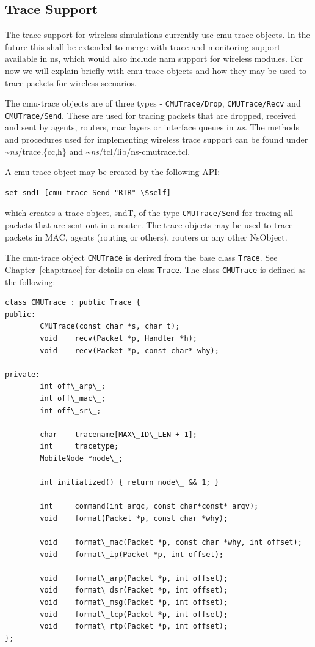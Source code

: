 \subsection{Trace Support}
\label{sec:mobile-trace}

The trace support for wireless simulations currently use cmu-trace
objects. In the future this shall be extended to merge with trace and
monitoring support available in ns, which would also include nam support
for wireless modules. For now we will explain briefly with cmu-trace
objects and how they may be used to trace packets for wireless scenarios. 

The cmu-trace objects are of three types - {\tt CMUTrace/Drop},
{\tt CMUTrace/Recv} and {\tt CMUTrace/Send}. These are used for tracing
packets that are dropped, received and sent by agents, routers, mac layers
or interface queues in \emph{ns}. The methods and procedures used for
implementing wireless trace support can be found under
\textasciitilde\emph{ns}/{trace.\{cc,h\}} and \textasciitilde\emph{ns}/{tcl/lib/ns-cmutrace.tcl}.

A cmu-trace object may be created by the following API:
\begin{verbatim}
set sndT [cmu-trace Send "RTR" \$self]
\end{verbatim} %
which creates a trace object, sndT, of the type {\tt CMUTrace/Send}
for tracing all packets that are sent out in a router. The trace
objects may be used to trace packets in MAC, agents (routing or
others), routers or any other NsObject. 

The cmu-trace object {\tt CMUTrace} is derived from the base class
{\tt Trace}. See Chapter~\ref{chap:trace} for details on class
{\tt Trace}. The class {\tt CMUTrace} is defined as the following:

\begin{verbatim}
class CMUTrace : public Trace {
public:
        CMUTrace(const char *s, char t);
        void    recv(Packet *p, Handler *h);
        void    recv(Packet *p, const char* why);

private:
        int off\_arp\_;
        int off\_mac\_;
        int off\_sr\_;

        char    tracename[MAX\_ID\_LEN + 1];
        int     tracetype;
        MobileNode *node\_;

        int initialized() { return node\_ && 1; }

        int     command(int argc, const char*const* argv);
        void    format(Packet *p, const char *why);

        void    format\_mac(Packet *p, const char *why, int offset);
        void    format\_ip(Packet *p, int offset);

        void    format\_arp(Packet *p, int offset);
        void    format\_dsr(Packet *p, int offset);
        void    format\_msg(Packet *p, int offset);
        void    format\_tcp(Packet *p, int offset);
        void    format\_rtp(Packet *p, int offset);
};
\end{verbatim}

